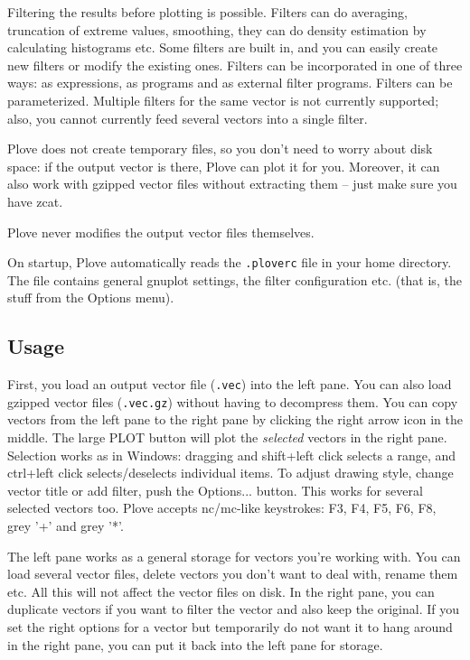 Filtering the results before plotting is
possible. Filters can do averaging, truncation of extreme values,
smoothing, they can do density estimation by
calculating histograms etc. Some filters are built
in, and you can easily create new filters or modify the existing ones.
Filters can be incorporated in one of three ways: as  expressions,
as  programs and as external filter programs. Filters can be
parameterized. Multiple filters for the same vector is not currently
supported; also, you cannot currently feed several vectors into a
single filter.

Plove does not create temporary files, so you don't need to worry
about disk space: if the output vector is there, Plove can plot
it for you. Moreover, it can also work with gzipped vector files
without extracting them -- just make sure you have zcat.


Plove never modifies the output vector files themselves.

On startup, Plove automatically reads the \texttt{.ploverc} file in
your home directory. The file contains general gnuplot settings, the
filter configuration etc. (that is, the stuff from the Options menu).




\subsection{Usage}

First, you load an output vector file (\texttt{.vec}) into the left
pane.  You can also load gzipped vector files (\texttt{.vec.gz})
without having to decompress them. You can copy vectors from the left
pane to the right pane by clicking the right arrow icon in the middle.
The large PLOT button will plot the \textit{selected} vectors in the
right pane. Selection works as in Windows: dragging and shift+left
click selects a range, and ctrl+left click selects/deselects
individual items. To adjust drawing style, change vector title or add
filter, push the Options... button. This works for several selected
vectors too. Plove accepts nc/mc-like keystrokes: F3, F4, F5, F6, F8,
grey '+' and grey '*'.


The left pane works as a general storage for vectors you're working
with. You can load several vector files, delete vectors you don't
want to deal with, rename them etc. All this will not affect
the vector files on disk. In the right pane, you can duplicate
vectors if you want to filter the vector and also keep the original.
If you set the right options for a vector but temporarily do
not want it to hang around in the right pane, you can put it
back into the left pane for storage.





